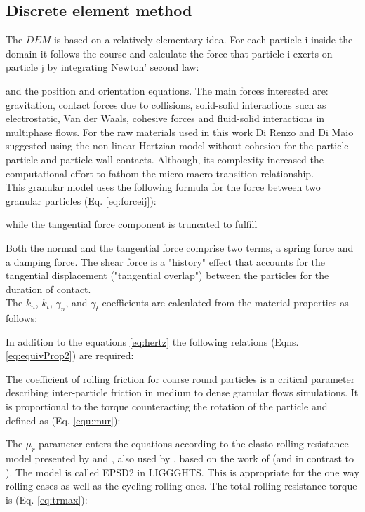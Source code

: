 \subsection{Discrete element method}
\label{subsec:dem}
The $DEM$ is based on a relatively elementary idea. For each particle i inside
the domain it follows the course and calculate the force that particle i exerts on particle j
by integrating Newton' second law:

 
and the position and orientation equations.
The main forces interested are: gravitation, contact forces due to collisions,
solid-solid interactions such as electrostatic, Van der Waals, cohesive forces
and fluid-solid interactions in multiphase flows.
For the raw materials used in this work Di Renzo and Di Maio \cite{RefWorks:145}
suggested using the non-linear Hertzian model without cohesion for the particle-particle and particle-wall contacts.
Although, its complexity increased the computational effort to fathom the
micro-macro transition relationship.\\
This granular model uses the following formula for the force between two granular particles (Eq. \ref{eq:forceij}):

while the tangential force component is truncated to fulfill

Both the normal and the tangential force comprise two terms, a spring force and a damping force. The shear force is a "history" effect that accounts for the tangential displacement 
("tangential overlap") between the particles for the duration of contact. \\

The $k_n$, $k_t$, $\gamma_n$, and $\gamma_t$ coefficients are calculated from the material properties as follows:

In addition to the equations \ref{eq:hertz} the following relations (Eqns. \ref{eq:equivProp2}) are required:

The coefficient of rolling friction for coarse round particles is a critical
parameter describing inter-particle friction in medium to dense granular flows simulations.
It is proportional to the torque counteracting the rotation of the particle and defined as (Eq. \ref{equ:mur}):

The $\mu_r$ parameter enters the equations according to the elasto-rolling
resistance model presented by \cite{RefWorks:87} and \cite{RefWorks:131}, also
used by \cite{RefWorks:173}, based on the work of
\cite{RefWorks:143}(and in contrast to \cite{RefWorks:144}). The model is called EPSD2 in LIGGGHTS.
This is appropriate for the one way rolling cases as well as the cycling rolling ones.
The total rolling resistance torque is (Eq. \ref{eq:trmax}):


